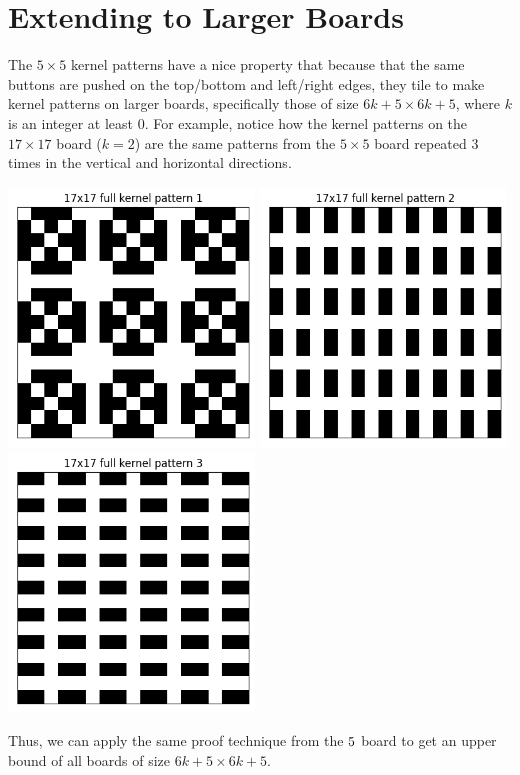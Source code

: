 \documentclass{article}
\begin{document}
	\section{Extending to Larger Boards}
	The $5 \times 5$ kernel patterns have a nice property that because that the same buttons are pushed on the top/bottom and left/right edges, they tile to make kernel patterns on larger boards, specifically those of size $6k + 5 \times 6k + 5$, where $k$ is an integer at least 0.
	For example, notice how the kernel patterns on the $17 \times 17$ board ($k = 2$) are the same patterns from the $5 \times 5$ board repeated 3 times in the vertical and horizontal directions.
	\begin{center}
		\includegraphics[width=0.49\textwidth]{../../code/serialization/kernels/17x17/full/17x17_kernel_full_1.png}
		\includegraphics[width=0.49\textwidth]{../../code/serialization/kernels/17x17/full/17x17_kernel_full_2.png}
		\includegraphics[width=0.49\textwidth]{../../code/serialization/kernels/17x17/full/17x17_kernel_full_3.png}
	\end{center}
	Thus, we can apply the same proof technique from the $5 \time 5$ board to get an upper bound of all boards of size $6k + 5 \times 6k + 5$.
	
\end{document}
